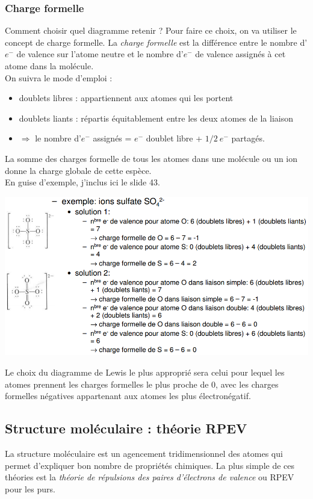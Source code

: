 \documentclass[12pt, a4paper]{article}
\begin{document}
\subsubsection{Charge formelle}
Comment choisir quel diagramme retenir ? Pour faire ce choix, on va utiliser le concept de charge formelle.
La \textit{charge formelle} est la différence entre le nombre d'$e^-$ de valence sur l'atome neutre et le nombre d'$e^-$ de valence assignés à cet atome dans la molécule.\\
On suivra le mode d'emploi :
\begin{itemize}
\item doublets libres : appartiennent aux atomes qui les portent
\item doublets liants : répartis équitablement entre les deux atomes de la liaison
\item $\Rightarrow$ le nombre d'$e^-$ assignés = $e^-$ doublet libre + $1/2\ e^-$ partagés.
\end{itemize}
La somme des charges formelle de tous les atomes dans une molécule ou un ion donne la charge globale de cette espèce.\\
En guise d'exemple, j'inclus ici le slide 43.\\
\begin{center}
\includegraphics[scale=0.55]{image11.png}\\
\end{center}
Le choix du diagramme de Lewis le plus approprié sera celui pour lequel les atomes prennent les charges formelles le plus proche de 0, avec les charges formelles négatives appartenant aux atomes les plus électronégatif.

\newpage
\subsection{Structure moléculaire : théorie RPEV}
La structure moléculaire est un agencement tridimensionnel des atomes qui permet d'expliquer bon nombre de propriétés chimiques. La plus simple de ces théories est la \textit{théorie de répulsions des paires d'électrons de valence} ou RPEV pour les purs.\\
\end{document}

